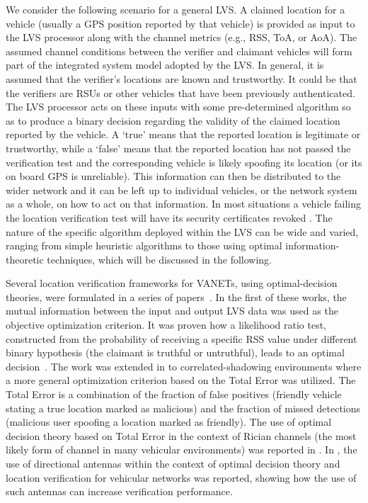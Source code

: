 \documentclass[journal]{IEEEtran}
\begin{document}
We consider the following scenario for a general LVS. A claimed location for a vehicle (usually a GPS position reported by that vehicle) is provided as input to the LVS processor along with the channel metrics (e.g., RSS, ToA, or AoA). The assumed channel conditions between the verifier and claimant vehicles will form part of the integrated system model adopted by the LVS. In general, it is assumed that the verifier's locations are known and trustworthy. It could be that the verifiers are RSUs or other vehicles that have been previously authenticated. The LVS processor acts on these inputs with some pre-determined algorithm so as to produce a binary decision regarding the validity of the claimed location reported by the vehicle. A `true' means that the reported location is legitimate or trustworthy, while a `false' means that the reported location has not passed the verification test and the corresponding vehicle is likely spoofing its location (or its on board GPS is unreliable). This information can then be distributed to the wider network and it can be left up to individual vehicles, or the network system as a whole, on how to act on that information. In most situations a vehicle failing the location verification test will have its security certificates revoked \cite{meneguetteintelligent}. The nature of the specific algorithm deployed within the LVS can be wide and varied, ranging from simple heuristic algorithms to those using optimal information-theoretic techniques, which will be discussed in the following.

Several location verification frameworks for VANETs, using optimal-decision theories, were formulated in a series of papers~\cite{yan2014optimal,yan2016location,yan2016LOCATION,monteiro2016information}. In the first of these works, the mutual information between the input and output LVS data was used as the objective optimization criterion. It was proven how a likelihood ratio test, constructed from the probability of receiving a specific RSS value under different binary hypothesis (the claimant is truthful or untruthful), leads to an optimal decision~\cite{yan2014optimal}.  The work was extended in \cite{yan2016location} to correlated-shadowing environments where a more general optimization criterion based on the Total Error  was utilized. The Total Error is a combination of the fraction of false positives (friendly vehicle stating a true location marked as malicious) and the fraction of missed detections (malicious user spoofing a location marked as friendly). The use of optimal decision theory based on Total Error in the context of Rician channels (the most likely form of channel in many vehicular environments) was reported in \cite{yan2016LOCATION}. In \cite{monteiro2016information}, the use of directional antennas within the context of optimal decision theory and location verification for vehicular networks was reported, showing how the use of such antennas can increase verification performance.
\end{document}
